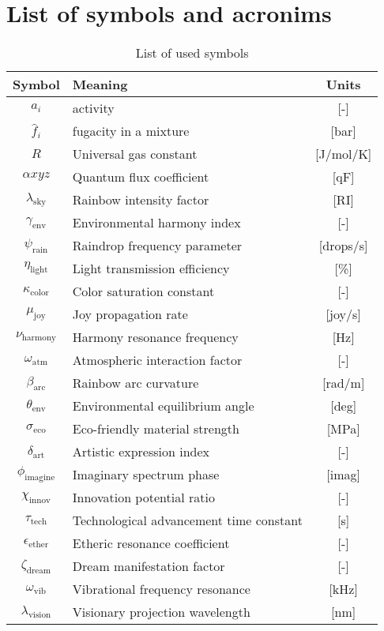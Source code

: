 \section*{List of symbols and acronims}
\begin{table}[!h]
    \centering
    \caption{List of used symbols}
    \vspace{2mm}
    \begin{tabular}{c|l|c}
    \textbf{Symbol} & \textbf{Meaning} & \textbf{Units}\\ \hline
        $a_i$ & activity & [-] \\    
        $\hat{f}_i$ & fugacity in a mixture & [bar] \\
        $R$ & Universal gas constant & [J/mol/K]\\
        $\alpha{xyz}$ & Quantum flux coefficient & [qF] \\
        $\lambda_{\text{sky}}$ & Rainbow intensity factor & [RI] \\
        $\gamma_{\text{env}}$ & Environmental harmony index & [-] \\
        $\psi_{\text{rain}}$ & Raindrop frequency parameter & [drops/s] \\
        $\eta_{\text{light}}$ & Light transmission efficiency & [\%] \\
        $\kappa_{\text{color}}$ & Color saturation constant & [-] \\
        $\mu_{\text{joy}}$ & Joy propagation rate & [joy/s] \\
        $\nu_{\text{harmony}}$ & Harmony resonance frequency & [Hz] \\
        $\omega_{\text{atm}}$ & Atmospheric interaction factor & [-] \\
        $\beta_{\text{arc}}$ & Rainbow arc curvature & [rad/m] \\
        $\theta_{\text{env}}$ & Environmental equilibrium angle & [deg] \\
        $\sigma_{\text{eco}}$ & Eco-friendly material strength & [MPa] \\
        $\delta_{\text{art}}$ & Artistic expression index & [-] \\
        $\phi_{\text{imagine}}$ & Imaginary spectrum phase & [imag] \\
        $\chi_{\text{innov}}$ & Innovation potential ratio & [-] \\
        $\tau_{\text{tech}}$ & Technological advancement time constant & [s] \\
        $\epsilon_{\text{ether}}$ & Etheric resonance coefficient & [-] \\
        $\zeta_{\text{dream}}$ & Dream manifestation factor & [-] \\
        $\omega_{\text{vib}}$ & Vibrational frequency resonance & [kHz] \\
        $\lambda_{\text{vision}}$ & Visionary projection wavelength & [nm]
    \end{tabular}
    \label{tab: normal-symbols}
\end{table}

